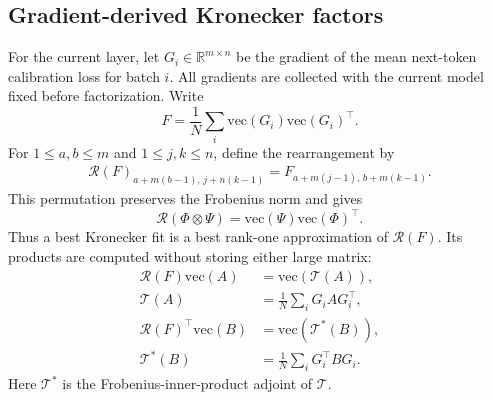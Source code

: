 \subsection{Gradient-derived Kronecker factors}\label{sup:fisher-estimation}

For the current layer, let $G_i\in\mathbb R^{m\times n}$ be the gradient of the mean next-token calibration loss for batch $i$. All gradients are collected with the current model fixed before factorization. Write
\begin{equation}
F=\frac1N\sum_i\mathrm{vec}(G_i)\mathrm{vec}(G_i)^\top.
\end{equation}
For $1\le a,b\le m$ and $1\le j,k\le n$, define the rearrangement by
\begin{equation}
\begin{aligned}
\mathcal R(F)_{a+m(b-1),\,j+n(k-1)}
=F_{a+m(j-1),\,b+m(k-1)}.
\end{aligned}
\end{equation}
This permutation preserves the Frobenius norm and gives
\begin{equation}
\mathcal R(\Phi\otimes\Psi)
=\mathrm{vec}(\Psi)\mathrm{vec}(\Phi)^\top.
\end{equation}
Thus a best Kronecker fit is a best rank-one approximation of $\mathcal R(F)$. Its products are computed without storing either large matrix:
\begin{equation}
\begin{aligned}
\mathcal R(F)\mathrm{vec}(A)&=\mathrm{vec}(\mathcal T(A)),\\
\mathcal T(A)&=\frac1N\sum_iG_iAG_i^\top,\\
\mathcal R(F)^\top\mathrm{vec}(B)&=\mathrm{vec}(\mathcal T^*(B)),\\
\mathcal T^*(B)&=\frac1N\sum_iG_i^\top BG_i.
\end{aligned}
\label{eq:sup-fisher-operators}
\end{equation}
Here $\mathcal T^*$ is the Frobenius-inner-product adjoint of $\mathcal T$.

